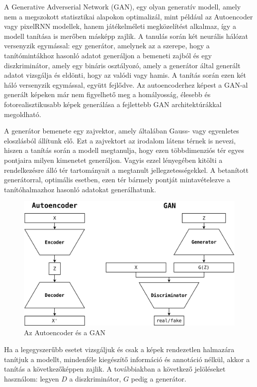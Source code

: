 A Generative Adverserial Network (GAN), egy olyan generatív modell, amely nem a megszokott statisztikai alapokon optimalizál, mint például az Autoencoder vagy pixelRNN modellek, hanem játékelméleti megközelítést alkalmaz, így a modell tanítása is merőben másképp zajlik.
A tanulás során két neurális hálózat versenyzik egymással: egy generátor, amelynek az a szerepe, hogy a tanítómintákhoz hasonló adatot generáljon a bemeneti zajból és egy diszkriminátor, amely egy bináris osztályozó, amely a generátor által generált adatot vizsgálja és eldönti, hogy az valódi vagy hamis.
A tanítás során ezen két háló versenyzik egymással, együtt fejlődve. Az autoencoderhez képest a GAN-al generált képeken már nem figyelhető meg a homályosság, élesebb és fotorealisztikusabb képek generálása a fejlettebb GAN architektúrákkal megoldható.

A generátor bemenete egy zajvektor, amely általában Gauss- vagy egyenletes eloszlásból állítunk elő. Ezt a zajvektort az irodalom látens térnek is nevezi, hiszen a tanítás során a modell megtanulja, hogy ezen többdimenziós tér egyes pontjaira milyen kimenetet generáljon. Vagyis ezzel lényegében kitölti a rendelkezésre álló tér tartományait a megtanult jellegzetességekkel. A betanított generátorral, optimális esetben, ezen tér bármely pontját mintavételezve a tanítóhalmazhoz hasonló adatokat generálhatunk.



\begin{figure}[h]
\centering
\includegraphics[width=12cm]{images/AEvsGAN.png}
\caption{Az Autoencoder és a GAN}
\label{fig:aevsgan}
\end{figure}


Ha a legegyszerűbb esetet vizsgáljuk és csak a képek rendezetlen halmazára tanítjuk a modellt, mindenféle kiegészítő információ és annotáció nélkül, akkor a tanítás a következőképpen zajlik.
A továbbiakban a következő jelöléseket használom: legyen $D$ a diszkriminátor, $G$ pedig a generátor.

